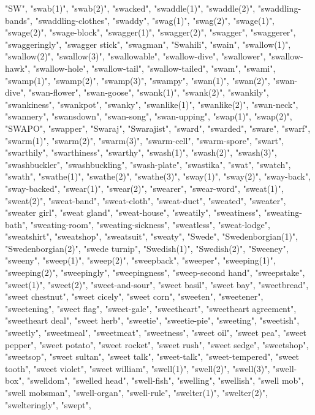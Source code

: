 "SW",
"swab(1)",
"swab(2)",
"swacked",
"swaddle(1)",
"swaddle(2)",
"swaddling-bands",
"swaddling-clothes",
"swaddy",
"swag(1)",
"swag(2)",
"swage(1)",
"swage(2)",
"swage-block",
"swagger(1)",
"swagger(2)",
"swagger",
"swaggerer",
"swaggeringly",
"swagger stick",
"swagman",
"Swahili",
"swain",
"swallow(1)",
"swallow(2)",
"swallow(3)",
"swallowable",
"swallow-dive",
"swallower",
"swallow-hawk",
"swallow-hole",
"swallow-tail",
"swallow-tailed",
"swam",
"swami",
"swamp(1)",
"swamp(2)",
"swamp(3)",
"swampy",
"swan(1)",
"swan(2)",
"swan-dive",
"swan-flower",
"swan-goose",
"swank(1)",
"swank(2)",
"swankily",
"swankiness",
"swankpot",
"swanky",
"swanlike(1)",
"swanlike(2)",
"swan-neck",
"swannery",
"swansdown",
"swan-song",
"swan-upping",
"swap(1)",
"swap(2)",
"SWAPO",
"swapper",
"Swaraj",
"Swarajist",
"sward",
"swarded",
"sware",
"swarf",
"swarm(1)",
"swarm(2)",
"swarm(3)",
"swarm-cell",
"swarm-spore",
"swart",
"swarthily",
"swarthiness",
"swarthy",
"swash(1)",
"swash(2)",
"swash(3)",
"swashbuckler",
"swashbuckling",
"swash-plate",
"swastika",
"swat",
"swatch",
"swath",
"swathe(1)",
"swathe(2)",
"swathe(3)",
"sway(1)",
"sway(2)",
"sway-back",
"sway-backed",
"swear(1)",
"swear(2)",
"swearer",
"swear-word",
"sweat(1)",
"sweat(2)",
"sweat-band",
"sweat-cloth",
"sweat-duct",
"sweated",
"sweater",
"sweater girl",
"sweat gland",
"sweat-house",
"sweatily",
"sweatiness",
"sweating-bath",
"sweating-room",
"sweating-sickness",
"sweatless",
"sweat-lodge",
"sweatshirt",
"sweatshop",
"sweatsuit",
"sweaty",
"Swede",
"Swedenborgian(1)",
"Swedenborgian(2)",
"swede turnip",
"Swedish(1)",
"Swedish(2)",
"Sweeney",
"sweeny",
"sweep(1)",
"sweep(2)",
"sweepback",
"sweeper",
"sweeping(1)",
"sweeping(2)",
"sweepingly",
"sweepingness",
"sweep-second hand",
"sweepstake",
"sweet(1)",
"sweet(2)",
"sweet-and-sour",
"sweet basil",
"sweet bay",
"sweetbread",
"sweet chestnut",
"sweet cicely",
"sweet corn",
"sweeten",
"sweetener",
"sweetening",
"sweet flag",
"sweet-gale",
"sweetheart",
"sweetheart agreement",
"sweetheart deal",
"sweet herb",
"sweetie",
"sweetie-pie",
"sweeting",
"sweetish",
"sweetly",
"sweetmeal",
"sweetmeat",
"sweetness",
"sweet oil",
"sweet pea",
"sweet pepper",
"sweet potato",
"sweet rocket",
"sweet rush",
"sweet sedge",
"sweetshop",
"sweetsop",
"sweet sultan",
"sweet talk",
"sweet-talk",
"sweet-tempered",
"sweet tooth",
"sweet violet",
"sweet william",
"swell(1)",
"swell(2)",
"swell(3)",
"swell-box",
"swelldom",
"swelled head",
"swell-fish",
"swelling",
"swellish",
"swell mob",
"swell mobsman",
"swell-organ",
"swell-rule",
"swelter(1)",
"swelter(2)",
"swelteringly",
"swept",
